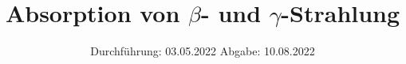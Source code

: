 

\subject{V704}
\title{Absorption von $\beta$- und $\gamma$-Strahlung}
\date{
  Durchführung: 03.05.2022
  \hspace{3em}
  Abgabe: 10.08.2022
}



\maketitle
\thispagestyle{empty}
\tableofcontents
\newpage








\newpage
\printbibliography{}
\nocite{matplotlib}
\nocite{numpy}
\nocite{scipy}
\nocite{uncertainties}
\nocite{reback2020pandas}


